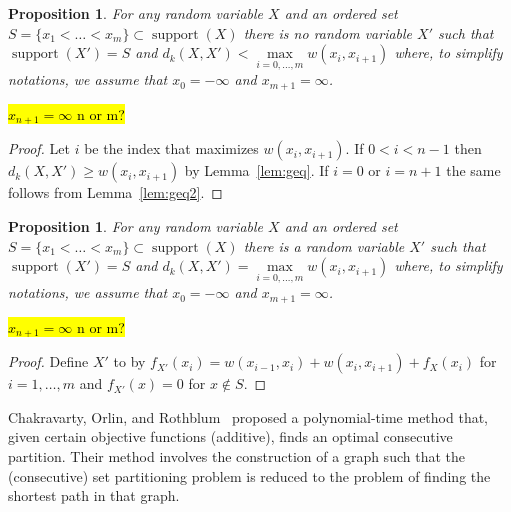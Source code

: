 \documentclass{article}
\newtheorem{proposition}[thm]{Proposition}
\DeclareMathOperator{\support}{support}
\begin{document}
\begin{proposition}
	For any random variable $X$ and an ordered set $S=\{x_1<\dots<x_m\} \subset \support(X)$ there is no random variable $X'$ such that $\support(X')=S$ and $d_k(X,X') < \max\limits_{i=0,\dots,m} w(x_{i}, x_{i+1})$ where, to simplify notations, we assume that $x_0=-\infty$ and $x_{m+1}=\infty$.
\end{proposition}
\hl{$x_{n+1}=\infty$ n or m?}
\begin{proof}
	Let $i$ be the index that maximizes $w(x_{i}, x_{i+1})$. If $0<i<n-1$ then $d_k(X,X') \geq w(x_{i}, x_{i+1})$ by Lemma~\ref{lem:geq}. If $i=0$ or $i=n+1$ the same follows from Lemma~\ref{lem:geq2}.
\end{proof}


\begin{proposition}
	For any random variable $X$ and an ordered set $S=\{x_1<\dots<x_m\} \subset \support(X)$ there is a random variable $X'$ such that $\support(X')=S$ and $d_k(X,X') = \max\limits_{i=0,\dots,m} w(x_{i}, x_{i+1})$ where, to simplify notations, we assume that $x_0=-\infty$ and $x_{m+1}=\infty$.
\end{proposition}
\hl{$x_{n+1}=\infty$ n or m?}
\begin{proof}
Define $X'$ to by $f_{X'}(x_i) = w(x_{i-1},x_i) + w(x_i,x_{i+1}) + f_{X}(x_i)$ for $i=1,\dots,m$ and $f_{X'}(x)=0$ for $x \notin S$.
\end{proof}

Chakravarty, Orlin, and Rothblum~\cite{chakravarty1982partitioning} proposed a polynomial-time method that, given certain objective functions (additive), finds an optimal consecutive partition. Their method involves the construction of a graph such that the (consecutive) set partitioning problem is reduced to the problem of finding the shortest path in that graph.
\end{document}
